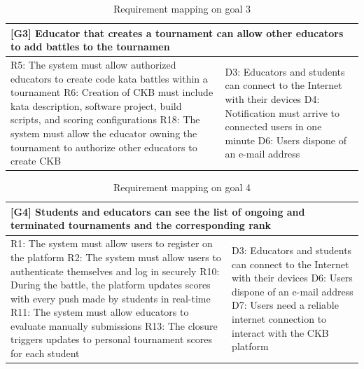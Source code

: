 \begin{table}[H]
    \centering
    \begin{tabular}{|p{8cm}|p{8cm}|}
    \hline
        \multicolumn{2}{|p{16cm}|}{\textbf{[G3] Educator that creates a tournament can allow other educators to add battles to the tournamen}} \\
    \hline
        R5: The system must allow authorized educators to create code kata battles within a tournament \newline
        R6: Creation of CKB must include kata description, software project, build scripts, and scoring configurations \newline
        R18: The system must allow the educator owning the tournament to authorize other educators to create CKB  
         &
         D3: Educators and students can connect to the Internet with their devices \newline
         D4: Notification must arrive to connected users in one minute \newline
         D6: Users dispone of an e-mail address \\
    \hline
    \end{tabular}
    \caption{Requirement mapping on goal 3}
    \label{tab:g3}
\end{table}
\begin{table}[h!]
    \centering
    \begin{tabular}{|p{8cm}|p{8cm}|}
    \hline
        \multicolumn{2}{|p{16cm}|}{\textbf{[G4] Students and educators can see the list of ongoing and terminated tournaments and the corresponding rank}} \\
    \hline
        R1: The system must allow users to register on the platform \newline
        R2: The system must allow users to authenticate themselves and log in securely \newline
        R10: During the battle, the platform updates scores with every push made by students in real-time \newline
        R11: The system must allow educators to evaluate manually submissions \newline
        R13: The closure triggers updates to personal tournament scores for each student
        &
        D3: Educators and students can connect to the Internet with their devices \newline
        D6: Users dispone of an e-mail address \newline
        D7: Users need a reliable internet connection to interact with the CKB platform \newline
        \\
    \hline
    \end{tabular}
    \caption{Requirement mapping on goal 4}
    \label{tab:g4}
\end{table}
